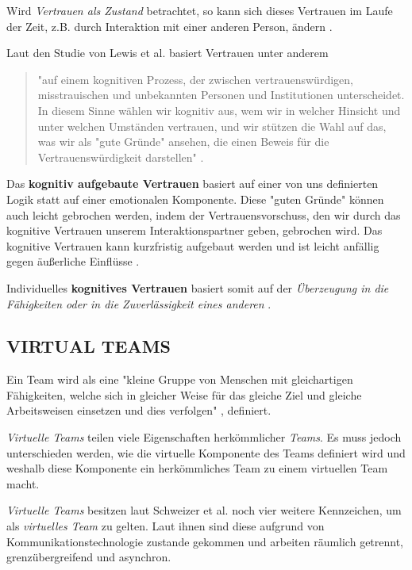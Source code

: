 \documentclass[sigchi]{acmart}
\begin{document}
Wird \textit{Vertrauen als Zustand} betrachtet, so kann sich dieses Vertrauen im Laufe der Zeit, z.B. durch Interaktion mit einer anderen Person, ändern \citep[S. 712]{mayer1995integrative}.

Laut den Studie von Lewis et al. \citep[S. 970-971]{lewis1985trust} basiert Vertrauen unter anderem 
\begin{quote}
"auf einem kognitiven Prozess, der zwischen vertrauenswürdigen, misstrauischen und unbekannten Personen und Institutionen unterscheidet. In diesem Sinne wählen wir kognitiv aus, wem wir in welcher Hinsicht und unter welchen Umständen vertrauen, und wir stützen die Wahl auf das, was wir als "gute Gründe" ansehen, die einen Beweis für die Vertrauenswürdigkeit darstellen" \citep[S. 970]{lewis1985trust}.
\end{quote}

Das \textbf{kognitiv aufgebaute Vertrauen} basiert auf einer von uns definierten Logik statt auf einer emotionalen Komponente. Diese "guten Gründe" können auch leicht gebrochen werden, indem der Vertrauensvorschuss, den wir durch das kognitive Vertrauen unserem Interaktionspartner geben, gebrochen wird.
Das kognitive Vertrauen kann kurzfristig aufgebaut werden und ist leicht anfällig gegen äußerliche Einflüsse \citep[S. 970]{lewis1985trust}. 

Individuelles \textbf{kognitives Vertrauen} basiert somit auf der \textit{Überzeugung in die Fähigkeiten oder in die Zuverlässigkeit eines anderen} \citep[S. 30]{mcallister1995affect}.

\subsection{VIRTUAL TEAMS}
Ein Team wird als eine "kleine Gruppe von Menschen mit gleichartigen Fähigkeiten, welche sich in gleicher Weise für das gleiche Ziel und gleiche Arbeitsweisen einsetzen und dies verfolgen" \citep[S. 2]{zenun2007effects}, definiert.

\textit{Virtuelle Teams} teilen viele Eigenschaften herkömmlicher \textit{Teams}. Es muss jedoch unterschieden werden, wie die virtuelle Komponente des Teams definiert wird und weshalb diese Komponente ein herkömmliches Team zu einem virtuellen Team macht.

\textit{Virtuelle Teams} besitzen laut Schweizer et al. \citep[S. 270]{schweitzer2010conceptualizing} noch vier weitere Kennzeichen, um als \textit{virtuelles Team} zu gelten. Laut ihnen sind diese aufgrund von Kommunikationstechnologie zustande gekommen und arbeiten räumlich getrennt, grenzübergreifend und asynchron.
\end{document}
